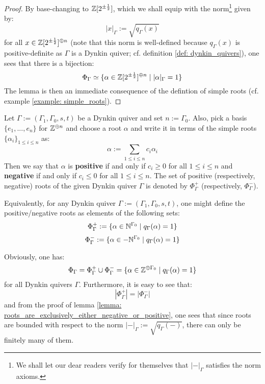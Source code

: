                 \begin{proof}
                    By base-changing to $\mathbb{Z}[2^{\pm \frac12}]$, which we shall equip with the norm\footnote{We shall let our dear readers verify for themselves that $|-|_{\Gamma}$ satisfies the norm axioms.} given by:
                        $$|x|_{\Gamma} := \sqrt{q_{\Gamma}(x)}$$
                    for all $x \in \mathbb{Z}[2^{\pm \frac12}]^{\oplus n}$ (note that this norm is well-defined because $q_{\Gamma}(x)$ is positive-definite as $\Gamma$ is a Dynkin quiver; cf. definition \ref{def: dynkin_quivers}), one sees that there is a bijection:
                        $$\Phi_{\Gamma} \simeq \{\alpha \in \mathbb{Z}[2^{\pm \frac12}]^{\oplus n} \mid |\alpha|_{\Gamma} = 1\}$$
                    The lemma is then an immediate consequence of the defintion of simple roots (cf. example \ref{example: simple_roots}).
                \end{proof}
            \begin{definition} \label{def: negative_and_positive_roots}
                Let $\Gamma := (\Gamma_1, \Gamma_0, s, t)$ be a Dynkin quiver and set $n := \Gamma_0$. Also, pick a basis $\{e_1, ..., e_n\}$ for $\mathbb{Z}^{\oplus n}$ and choose a root $\alpha$ and write it in terms of the simple roots $\{\alpha_i\}_{1 \leq i \leq n}$ as:
                    $$\alpha := \sum_{1 \leq i \leq n} c_i \alpha_i$$
                Then we say that $\alpha$ is \textbf{positive} if and only if $c_i \geq 0$ for all $1 \leq i \leq n$ and \textbf{negative} if and only if $c_i \leq 0$ for all $1 \leq i \leq n$. The set of positive (respectively, negative) roots of the given Dynkin quiver $\Gamma$ is denoted by $\Phi_{\Gamma}^+$ (respectively, $\Phi_{\Gamma}^-$).
            \end{definition}
            \begin{remark}
                Equivalently, for any Dynkin quiver $\Gamma := (\Gamma_1, \Gamma_0, s, t)$, one might define the positive/negative roots as elements of the following sets:
                    $$\Phi_{\Gamma}^+ := \{\alpha \in \mathbb{N}^{\Gamma_0} \mid q_{\Gamma}(\alpha) = 1\}$$
                    $$\Phi_{\Gamma}^- := \{\alpha \in -\mathbb{N}^{\Gamma_0} \mid q_{\Gamma}(\alpha) = 1\}$$
            \end{remark}
            \begin{remark} \label{remark: number_of_positive_roots_of_dynkin_quivers}
                Obviously, one has:
                    $$\Phi_{\Gamma} = \Phi_{\Gamma}^+ \cup \Phi_{\Gamma}^- = \{\alpha \in \mathbb{Z}^{\oplus \Gamma_0} \mid q_{\Gamma}(\alpha) = 1\}$$
                for all Dynkin quivers $\Gamma$. Furthermore, it is easy to see that:
                    $$|\Phi_{\Gamma}^+| = |\Phi_{\Gamma}^-|$$
                and from the proof of lemma \ref{lemma: roots_are_exclusively_either_negative_or_positive}, one sees that since roots are bounded with respect to the norm $|-|_{\Gamma} := \sqrt{q_{\Gamma}(-)}$, there can only be finitely many of them.
            \end{remark}
            

